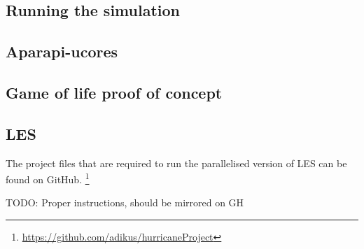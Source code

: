 \documentclass{l4proj}
\begin{document}
\begin{appendices}

\chapter{Running the simulation}
\label{chap:running}

\section{Aparapi-ucores}

\section{Game of life proof of concept}

\section{LES}

The project files that are required to run the parallelised version of LES can be found on GitHub.
\footnote{\url{https://github.com/adikus/hurricaneProject}}

TODO: Proper instructions, should be mirrored on GH

\end{appendices}



  

\end{document}
